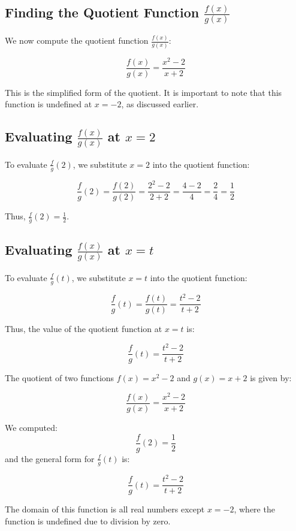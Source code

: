 \subsection*{Finding the Quotient Function \( \frac{f(x)}{g(x)} \)}

We now compute the quotient function \( \frac{f(x)}{g(x)} \):

\[
\frac{f(x)}{g(x)} = \frac{x^2 - 2}{x + 2}
\]

This is the simplified form of the quotient. It is important to note that this function is undefined at \( x = -2 \), as discussed earlier.

\subsection*{Evaluating \( \frac{f(x)}{g(x)} \) at \( x = 2 \)}

To evaluate \( \frac{f}{g}(2) \), we substitute \( x = 2 \) into the quotient function:

\[
\frac{f}{g}(2) = \frac{f(2)}{g(2)} = \frac{2^2 - 2}{2 + 2} = \frac{4 - 2}{4} = \frac{2}{4} = \frac{1}{2}
\]

Thus, \( \frac{f}{g}(2) = \frac{1}{2} \).

\subsection*{Evaluating \( \frac{f(x)}{g(x)} \) at \( x = t \)}

To evaluate \( \frac{f}{g}(t) \), we substitute \( x = t \) into the quotient function:

\[
\frac{f}{g}(t) = \frac{f(t)}{g(t)} = \frac{t^2 - 2}{t + 2}
\]

Thus, the value of the quotient function at \( x = t \) is:

\[
\frac{f}{g}(t) = \frac{t^2 - 2}{t + 2}
\]


The quotient of two functions \( f(x) = x^2 - 2 \) and \( g(x) = x + 2 \) is given by:

\[
\frac{f(x)}{g(x)} = \frac{x^2 - 2}{x + 2}
\]

We computed:
\[
\frac{f}{g}(2) = \frac{1}{2}
\]
and the general form for \( \frac{f}{g}(t) \) is:

\[
\frac{f}{g}(t) = \frac{t^2 - 2}{t + 2}
\]

The domain of this function is all real numbers except \( x = -2 \), where the function is undefined due to division by zero.



